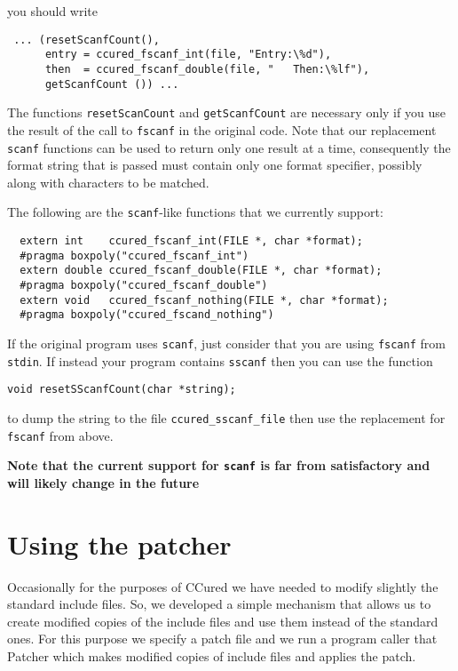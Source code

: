 \documentclass{book}
\def\t#1{{\tt #1}}
\begin{document}
 you should write
\begin{verbatim}
 ... (resetScanfCount(), 
      entry = ccured_fscanf_int(file, "Entry:\%d"),
      then  = ccured_fscanf_double(file, "   Then:\%lf"),
      getScanfCount ()) ...
\end{verbatim}

 The functions \t{resetScanCount} and \t{getScanfCount} are necessary only
if you use the result of the call to \t{fscanf} in the original code. Note
that our replacement \t{scanf} functions can be used to return only one result
at a time, consequently the format string that is passed must contain only one
format specifier, possibly along with characters to be matched. 

 The following are the \t{scanf}-like functions that we currently support:
\begin{verbatim}
  extern int    ccured_fscanf_int(FILE *, char *format);
  #pragma boxpoly("ccured_fscanf_int")
  extern double ccured_fscanf_double(FILE *, char *format);
  #pragma boxpoly("ccured_fscanf_double")
  extern void   ccured_fscanf_nothing(FILE *, char *format);
  #pragma boxpoly("ccured_fscand_nothing")
\end{verbatim}

 If the original program uses \t{scanf}, just consider that you are using
\t{fscanf} from \t{stdin}. If instead your program contains \t{sscanf} then
you can use the function 
\begin{verbatim}
void resetSScanfCount(char *string);
\end{verbatim}

 to dump the string to the file \t{ccured\_sscanf\_file} then use the
replacement for \t{fscanf} from above. 

 {\bf Note that the current support for \t{scanf} is far from satisfactory and
 will likely change in the future}


    \chapter{Using the patcher}\label{ch-patcher}

 Occasionally for the purposes of CCured we have needed to modify slightly the
standard include files. So, we developed a simple mechanism that allows us to
create modified copies of the include files and use them instead of the
standard ones. For this purpose we specify a patch file and we run a program
caller that Patcher which makes modified copies of include files and applies
the patch. 
\end{document}

